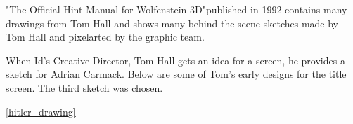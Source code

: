 \documentclass[book.tex]{subfiles}
\begin{document}
\begin{minipage}{0.7\textwidth}
"The Official Hint Manual for Wolfenstein 3D"\protect\footnotemark published in 1992 contains many drawings from Tom Hall and shows many behind the scene sketches made by Tom Hall and pixelarted by the graphic team.\\
\par
 \begin{fancyquotes}
When Id's Creative Director, Tom Hall gets an idea for a screen, he provides a sketch for Adrian Carmack. Below are some of Tom's early designs for the title screen. The third sketch was chosen.\\
\end{fancyquotes}
\end{minipage}
\begin{minipage}{0.3\textwidth}
\begin{flushright}
\end{flushright}
\end{minipage}

\noindent
   \begin{figure}[H]
\centering
 \par
 \end{figure}
 \par
   

 




\ref{hitler_drawing}
\begin{figure}[H]
\centering    
   \end{figure}



     \begin{figure}[H]
\centering
   \end{figure}
 
  \begin{figure}[H]
\centering
 \\
 \end{figure}



     \begin{figure}[H]
\centering
   \end{figure}
\end{document}
